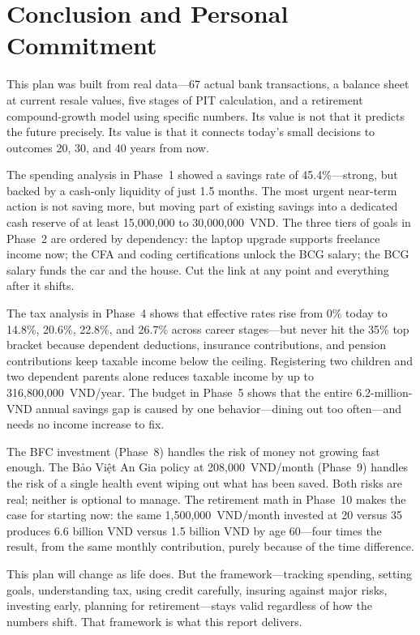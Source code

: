 \chapter*{Conclusion and Personal Commitment}

This plan was built from real data---67 actual bank transactions, a balance sheet at current resale values, five stages of PIT calculation, and a retirement compound-growth model using specific numbers. Its value is not that it predicts the future precisely. Its value is that it connects today's small decisions to outcomes 20, 30, and 40 years from now.

The spending analysis in Phase~1 showed a savings rate of 45.4\%---strong, but backed by a cash-only liquidity of just 1.5 months. The most urgent near-term action is not saving more, but moving part of existing savings into a dedicated cash reserve of at least 15,000,000 to 30,000,000~VND. The three tiers of goals in Phase~2 are ordered by dependency: the laptop upgrade supports freelance income now; the CFA and coding certifications unlock the BCG salary; the BCG salary funds the car and the house. Cut the link at any point and everything after it shifts.

The tax analysis in Phase~4 shows that effective rates rise from 0\% today to 14.8\%, 20.6\%, 22.8\%, and 26.7\% across career stages---but never hit the 35\% top bracket because dependent deductions, insurance contributions, and pension contributions keep taxable income below the ceiling. Registering two children and two dependent parents alone reduces taxable income by up to 316,800,000~VND/year. The budget in Phase~5 shows that the entire 6.2-million-VND annual savings gap is caused by one behavior---dining out too often---and needs no income increase to fix.

The BFC investment (Phase~8) handles the risk of money not growing fast enough. The Bảo Việt An Gia policy at 208,000~VND/month (Phase~9) handles the risk of a single health event wiping out what has been saved. Both risks are real; neither is optional to manage. The retirement math in Phase~10 makes the case for starting now: the same 1,500,000~VND/month invested at 20 versus 35 produces 6.6 billion VND versus 1.5 billion VND by age 60---four times the result, from the same monthly contribution, purely because of the time difference.

This plan will change as life does. But the framework---tracking spending, setting goals, understanding tax, using credit carefully, insuring against major risks, investing early, planning for retirement---stays valid regardless of how the numbers shift. That framework is what this report delivers.
